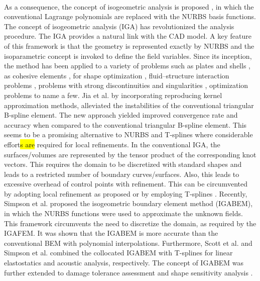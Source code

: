 \paragraph{}
As a consequence, the concept of isogeometric analysis is proposed \citep{Hug2005}, in which the conventional Lagrange polynomials are replaced with the NURBS basis functions.
The concept of isogeometric analysis (IGA) has revolutionized the analysis procedure.
The IGA provides a natural link with the CAD model.
A key feature of this framework is that the geometry is represented exactly by NURBS and the isoparametric concept is invoked to define the field variables.
Since its inception, the method has been applied to a variety of problems such as plates and shells \citep{NGUYENTHANH20113410,NGUYENXUAN2014222,HOSSEINI20141}, as
cohesive elements \citep{NGUYEN2014193}, for shape optimization \citep{WALL20082976}, fluid–structure interaction problems \citep{BAZILEVS201228}, problems with strong discontinuities and singularities \citep{doi:10.1093/imamat/hxu004, doi:10.1002/nme.4580, BAZILEVS201228}, optimization problems \citep{GHASEMI2014463} to name a few.
Jia et al. \citep{JIA2013342} by incorporating reproducing kernel approximation methods, alleviated the instabilities of the conventional triangular B-spline element.
The new approach yielded improved convergence rate and accuracy when compared to the conventional triangular B-spline element.
This seems to be a promising alternative to NURBS and T-splines where considerable effort\hl{s are} required for local refinements. 
In the conventional IGA, the surfaces/volumes are represented by the tensor product of the corresponding knot vectors.
This requires the domain to be discretized with standard shapes and leads to a restricted number of boundary curves/surfaces.
Also, this leads to excessive overhead of control points with refinement.
This can be circumvented by adopting local refinement as proposed \citep{NGUYENTHANH20111892} or by employing T-splines \citep{Sederberg:2003:TT:882262.882295}.
Recently, Simpson et al. \citep{Sim2013, SIMPSON201287} proposed the isogeometric boundary element method (IGABEM), in which the NURBS functions were used to approximate the unknown fields.
This framework circumvents the need to discretize the domain, as required by the IGAFEM.
It was shown that the IGABEM is more accurate than the conventional BEM with polynomial interpolations.
Furthermore, Scott et al. \citep{Sco2013} and Simpson et al. \citep{SIMPSON2014265} combined the collocated IGABEM with T-splines for linear elastostatics and acoustic analysis, respectively.
The concept of IGABEM was further extended to damage tolerance assessment \citep{PengXuan;AtroshchenkoElena;Bordas2014} and shape sensitivity analysis \citep{LianHaojie;SimpsonRobert;Bordas2013}.
